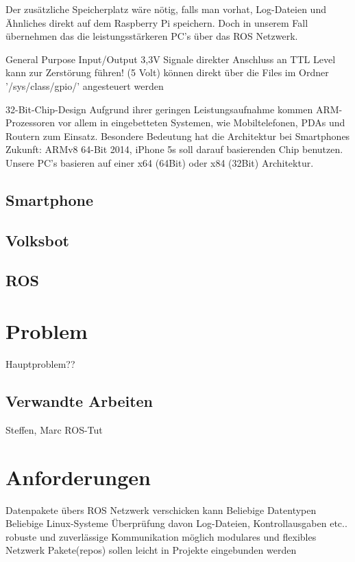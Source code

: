 \documentclass[12pt]{article}
\begin{document}
Der zusätzliche Speicherplatz wäre nötig, falls man vorhat, Log-Dateien und Ähnliches direkt auf dem Raspberry Pi speichern. 
Doch in unserem Fall übernehmen das die leistungsstärkeren PC's über das ROS Netzwerk.

General Purpose Input/Output
3,3V Signale
direkter Anschluss an TTL Level kann zur Zerstörung führen! (5 Volt)
können direkt über die Files im Ordner '/sys/class/gpio/' angesteuert werden

32-Bit-Chip-Design
Aufgrund ihrer geringen Leistungsaufnahme kommen ARM-Prozessoren vor allem in eingebetteten Systemen, wie Mobiltelefonen, PDAs und Routern zum Einsatz.
Besondere Bedeutung hat die Architektur bei Smartphones
Zukunft: ARMv8 64-Bit 2014, iPhone 5s soll darauf basierenden Chip benutzen.
Unsere PC's basieren auf einer x64 (64Bit) oder x84 (32Bit) Architektur.


\subsection{Smartphone}

\subsection{Volksbot}

\subsection{ROS}



\section{Problem}

Hauptproblem??

\subsection{Verwandte Arbeiten}

Steffen, Marc
ROS-Tut

\section{Anforderungen}

Datenpakete übers ROS Netzwerk verschicken kann
Beliebige Datentypen
Beliebige Linux-Systeme
Überprüfung davon Log-Dateien, Kontrollausgaben etc..
robuste und zuverlässige Kommunikation möglich
modulares und flexibles Netzwerk
Pakete(repos) sollen leicht in Projekte eingebunden werden
\end{document}
